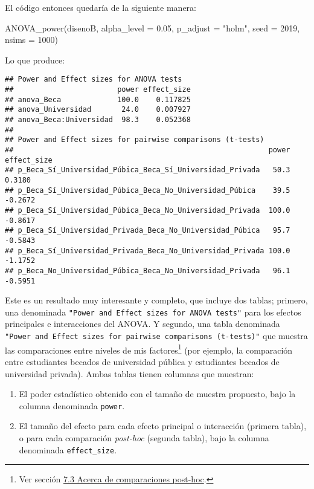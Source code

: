 \documentclass[
]{article}
\newenvironment{Shaded}{\begin{snugshade}}{\end{snugshade}}
\newcommand{\AttributeTok}[1]{\textcolor[rgb]{0.16,0.50,0.73}{#1}}
\newcommand{\DecValTok}[1]{\textcolor[rgb]{0.96,0.45,0.00}{#1}}
\newcommand{\FloatTok}[1]{\textcolor[rgb]{0.96,0.45,0.00}{#1}}
\newcommand{\FunctionTok}[1]{\textcolor[rgb]{0.56,0.27,0.68}{#1}}
\newcommand{\NormalTok}[1]{\textcolor[rgb]{0.81,0.81,0.76}{#1}}
\newcommand{\StringTok}[1]{\textcolor[rgb]{0.96,0.31,0.31}{#1}}
\providecommand{\tightlist}{%
  \setlength{\itemsep}{0pt}\setlength{\parskip}{0pt}}
\begin{document}
El código entonces quedaría de la siguiente manera:

\begin{Shaded}
\begin{Highlighting}[]
\FunctionTok{ANOVA\_power}\NormalTok{(disenoB, }
            \AttributeTok{alpha\_level =} \FloatTok{0.05}\NormalTok{,}
            \AttributeTok{p\_adjust =} \StringTok{"holm"}\NormalTok{, }
            \AttributeTok{seed =} \DecValTok{2019}\NormalTok{, }
            \AttributeTok{nsims =} \DecValTok{1000}\NormalTok{)}
\end{Highlighting}
\end{Shaded}

Lo que produce:

\begin{verbatim}
## Power and Effect sizes for ANOVA tests
##                        power effect_size
## anova_Beca             100.0    0.117825
## anova_Universidad       24.0    0.007927
## anova_Beca:Universidad  98.3    0.052368
## 
## Power and Effect sizes for pairwise comparisons (t-tests)
##                                                           power effect_size
## p_Beca_Sí_Universidad_Púbica_Beca_Sí_Universidad_Privada   50.3      0.3180
## p_Beca_Sí_Universidad_Púbica_Beca_No_Universidad_Púbica    39.5     -0.2672
## p_Beca_Sí_Universidad_Púbica_Beca_No_Universidad_Privada  100.0     -0.8617
## p_Beca_Sí_Universidad_Privada_Beca_No_Universidad_Púbica   95.7     -0.5843
## p_Beca_Sí_Universidad_Privada_Beca_No_Universidad_Privada 100.0     -1.1752
## p_Beca_No_Universidad_Púbica_Beca_No_Universidad_Privada   96.1     -0.5951
\end{verbatim}

Este es un resultado muy interesante y completo, que incluye dos tablas;
primero, una denominada
\texttt{"Power\ and\ Effect\ sizes\ for\ ANOVA\ tests"} para los efectos
principales e interacciones del ANOVA. Y segundo, una tabla denominada
\texttt{"Power\ and\ Effect\ sizes\ for\ pairwise\ comparisons\ (t-tests)"}
que muestra las comparaciones entre niveles de mis factores\footnote{Ver
  sección \protect\hyperlink{multcomp}{7.3 Acerca de comparaciones
  post-hoc}.} (por ejemplo, la comparación entre estudiantes becados de
universidad pública y estudiantes becados de universidad privada). Ambas
tablas tienen columnas que muestran:

\begin{enumerate}
\def\labelenumi{\arabic{enumi}.}
\tightlist
\item
  El poder estadístico obtenido con el tamaño de muestra propuesto, bajo
  la columna denominada \texttt{power}.
\item
  El tamaño del efecto para cada efecto principal o interacción (primera
  tabla), o para cada comparación \emph{post-hoc} (segunda tabla), bajo
  la columna denominada \texttt{effect\_size}.
\end{enumerate}
\end{document}
